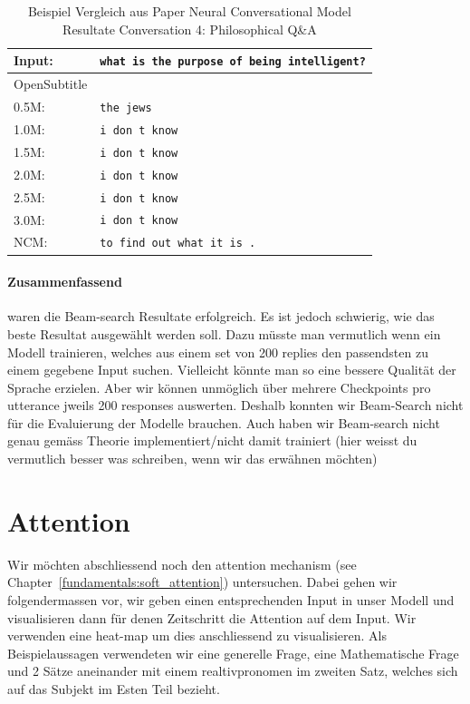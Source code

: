 \begin{table}[H]
	\centering
	\begin{adjustbox}{max width=\textwidth}
		\begin{tabular}{ll}
			\toprule
			Input: 	& \texttt{what is the purpose of being intelligent?}\\
			\midrule
			OpenSubtitle\\
			0.5M: 	& \texttt{the jews}\\
			1.0M: 	& \texttt{i don t know}\\
			1.5M:	& \texttt{i don t know}\\
			2.0M:	& \texttt{i don t know}\\
			2.5M:	& \texttt{i don t know}\\
			3.0M:	& \texttt{i don t know}\\
			\midrule
			NCM:	& \texttt{to find out what it is .}\\
			\bottomrule
		\end{tabular}
	\end{adjustbox}
	\caption{Beispiel Vergleich aus Paper Neural Conversational Model Resultate Conversation 4: Philosophical Q\&A}
	\label{results:example20_output:OpenSubtitle}
\end{table}

\paragraph{Zusammenfassend} waren die Beam-search Resultate erfolgreich. Es ist jedoch schwierig, wie das beste Resultat ausgewählt werden soll. Dazu müsste man vermutlich wenn ein Modell trainieren, welches aus einem set von 200 replies den passendsten zu einem gegebene Input suchen. Vielleicht könnte man so eine bessere Qualität der Sprache erzielen. Aber wir können unmöglich über mehrere Checkpoints pro utterance jweils 200 responses auswerten. Deshalb konnten wir Beam-Search nicht für die Evaluierung der Modelle brauchen. Auch haben wir Beam-search nicht genau gemäss Theorie implementiert/nicht damit trainiert (hier weisst du vermutlich besser was schreiben, wenn wir das erwähnen möchten)
\section{Attention}
Wir möchten abschliessend noch den attention mechanism (see Chapter~\ref{fundamentals:soft_attention}) untersuchen. Dabei gehen wir folgendermassen vor, wir geben einen entsprechenden Input in unser Modell und visualisieren dann für denen Zeitschritt die Attention auf dem Input. Wir verwenden eine heat-map um dies anschliessend zu visualisieren. Als Beispielaussagen verwendeten wir eine generelle Frage, eine Mathematische Frage und 2 Sätze aneinander mit einem realtivpronomen im zweiten Satz, welches sich auf das Subjekt im Esten Teil bezieht.

